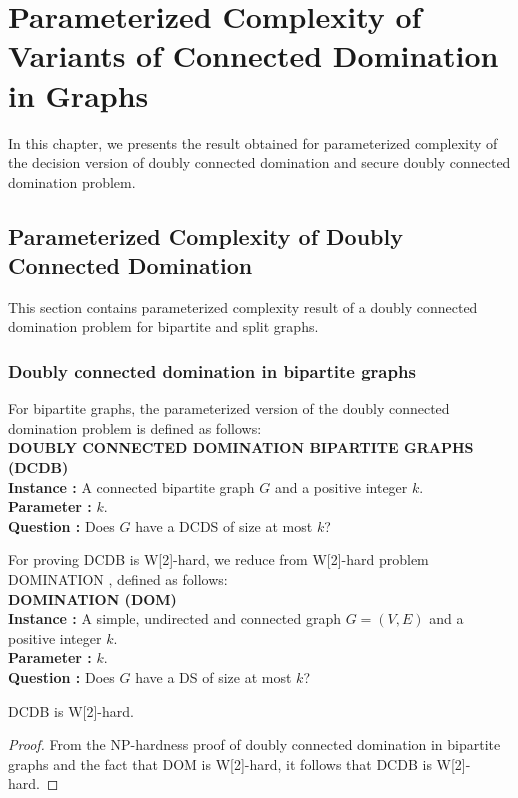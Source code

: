 \chapter{Parameterized Complexity of Variants of Connected Domination in Graphs} 
\noindent
In this chapter, we presents the result obtained for parameterized complexity of the decision version of doubly connected domination and secure doubly connected domination problem.
\section{Parameterized Complexity of Doubly Connected Domination}
\noindent
This section contains parameterized complexity result of a doubly connected domination problem for bipartite and split graphs.
\subsection{Doubly connected domination in bipartite graphs}
\noindent 
For bipartite graphs, the parameterized version of the doubly connected domination problem is defined as follows:\\
\textbf{DOUBLY CONNECTED DOMINATION BIPARTITE GRAPHS (DCDB)}\\
\indent \textbf{Instance :} A connected bipartite graph $G$ and a positive integer $k$.\\
\indent \textbf{Parameter :} $k$.\\
\indent \textbf{Question :} Does $G$ have a DCDS of size at most $k$? \smallskip

\noindent For proving DCDB is W[2]-hard, we reduce from W[2]-hard problem DOMINATION \cite{ppc}, defined as follows:\\
\textbf{DOMINATION (DOM)}\\
\indent \textbf{Instance :} A simple, undirected and connected graph $G=(V,E)$ and a positive integer $k$.\\
\indent \textbf{Parameter :} $k$.\\
\indent \textbf{Question :} Does $G$ have a DS of size at most $k$?
\begin{theorem}
DCDB is W[2]-hard.
\end{theorem}
\begin{proof}
From the NP-hardness proof of doubly connected domination in bipartite graphs \cite{dcds} and the fact that DOM is W[2]-hard, it follows that DCDB is W[2]-hard.
\end{proof}
